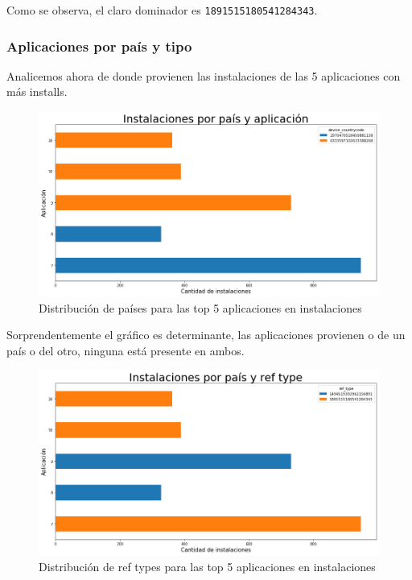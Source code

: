 \documentclass[a4paper, 12pt]{article}
\begin{document}
		Como se observa, el claro dominador es \texttt{1891515180541284343}.

	\subsubsection{Aplicaciones por país y tipo}

		Analicemos ahora de donde provienen las instalaciones de las 5 aplicaciones con más installs.

		\FloatBarrier
		\begin{figure}[h]
			\centering
			\includegraphics[width=\textwidth]{images/installs/appsxpais.png}
			\caption{Distribución de países para las top 5 aplicaciones en instalaciones}
		\end{figure}
		\FloatBarrier

		Sorprendentemente el gráfico es determinante, las aplicaciones provienen o de un país o del otro, ninguna está presente en ambos.

		\FloatBarrier
		\begin{figure}[h]
			\centering
			\includegraphics[width=\textwidth]{images/installs/paisref.png}
			\caption{Distribución de ref types para las top 5 aplicaciones en instalaciones}
		\end{figure}
		\FloatBarrier
\end{document}

